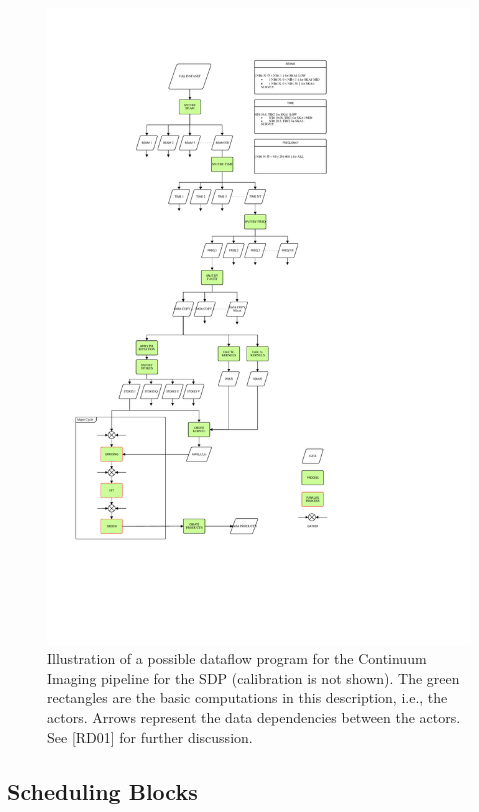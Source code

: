 \documentclass[11pt,a4paper]{article}
\begin{document}
\begin{figure}
  \includegraphics[width=\textwidth,trim=0 4cm 0 0]{figs/dataflow/ContinuumImagingPipeline-Overview}
  \caption{Illustration of a possible dataflow program for the
    Continuum Imaging pipeline for the SDP (calibration is not
    shown). The green rectangles are the basic computations in this
    description, i.e., the actors. Arrows represent the data
    dependencies between the actors.  See [RD01] for further
    discussion.}
  \label{fig:contdataflow}
\end{figure}



\subsection{Scheduling Blocks}
\end{document}
